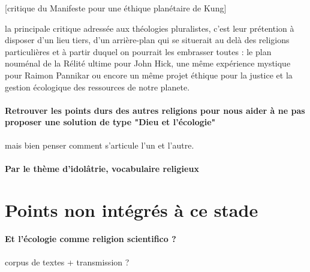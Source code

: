 [critique du Manifeste pour une éthique planétaire de Kung]
\begin{singlequote}
la principale critique adressée aux théologies pluralistes, c’est leur prétention à disposer d’un lieu tiers, d’un arrière-plan qui se situerait au delà des religions particulières et à partir duquel on pourrait les embrasser toutes : le plan nouménal de la Rélité ultime pour John Hick, une même expérience mystique pour Raimon Pannikar ou encore un même projet éthique pour la justice et la gestion écologique des ressources de notre planete. \cite[p. 111]{cheno_dieu_2017} 
\end{singlequote}


\paragraph{Retrouver les points durs des autres religions pour nous aider à ne pas proposer une solution de type "Dieu et l'écologie"} mais bien penser comment s'articule l'un et l'autre. 


\paragraph{Par le thème d'idolâtrie, vocabulaire religieux}


\section{Points non intégrés à ce stade}
\paragraph{Et l'écologie comme religion scientifico ?} corpus de textes + transmission ?


\begin{comment}


\paragraph{En quoi cela concerne le dialogue inter religieux} et pas uniquement Christianisme et écologie / ...
D'abord, Règne de Dieu. ensuite, intuition comme pour le dialogue inter-religieux que le Christianisme porte dans sa matrice une universalité et une hospitalité aux questions du temps, qui l'ouvre peut être de façon privilégiée à ces questions. 

\paragraph{Dialogue inter religieux et écologie} hypothèse que les religions peuvent aider à un effort maintenant pour un gain plus long, donner du sens, Règne de Dieu. Voir comment le Christianisme peut être pertinent sur le sujet.
Dialogue inter-religieux dans ce contexte. Sociologie des religions : permettant de valider cette hypothèse.
Règne de Dieu et Ecologie

\end{comment}



